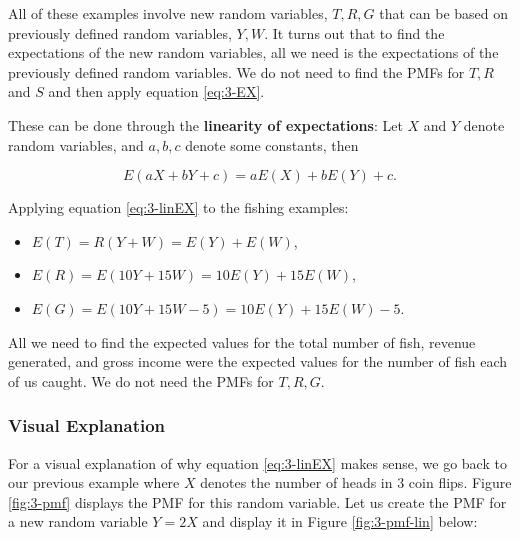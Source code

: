 \documentclass[
]{book}
\providecommand{\tightlist}{%
  \setlength{\itemsep}{0pt}\setlength{\parskip}{0pt}}
\begin{document}
All of these examples involve new random variables, \(T, R, G\) that can be based on previously defined random variables, \(Y, W\). It turns out that to find the expectations of the new random variables, all we need is the expectations of the previously defined random variables. We do not need to find the PMFs for \(T, R\) and \(S\) and then apply equation \eqref{eq:3-EX}.

These can be done through the \textbf{linearity of expectations}: Let \(X\) and \(Y\) denote random variables, and \(a,b,c\) denote some constants, then

\begin{equation} 
E(aX + bY + c) = aE(X) + bE(Y) + c.
\label{eq:3-linEX}
\end{equation}

Applying equation \eqref{eq:3-linEX} to the fishing examples:

\begin{itemize}
\tightlist
\item
  \(E(T) = R(Y + W) = E(Y) + E(W)\),
\item
  \(E(R) = E(10Y + 15W) = 10E(Y) + 15E(W)\),
\item
  \(E(G) = E(10Y + 15W - 5) = 10E(Y) + 15E(W) - 5\).
\end{itemize}

All we need to find the expected values for the total number of fish, revenue generated, and gross income were the expected values for the number of fish each of us caught. We do not need the PMFs for \(T,R,G\).

\subsubsection{Visual Explanation}\label{visual-explanation}

For a visual explanation of why equation \eqref{eq:3-linEX} makes sense, we go back to our previous example where \(X\) denotes the number of heads in 3 coin flips. Figure \ref{fig:3-pmf} displays the PMF for this random variable. Let us create the PMF for a new random variable \(Y=2X\) and display it in Figure \ref{fig:3-pmf-lin} below:
\end{document}
